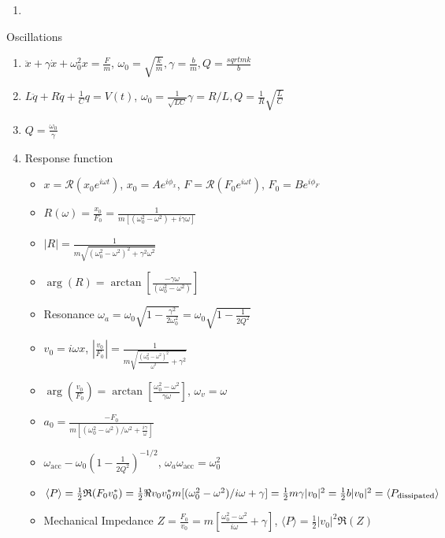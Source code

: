 \documentclass{article}
\theoremstyle{remark}
\theoremstyle{remark}
\newcommand{\realp}[1]{\mathfrak{R}(#1)}
\begin{document}
\begin{enumerate}
    \item 
\end{enumerate}

Oscillations
\begin{enumerate}
    \item $\ddot{x}+\gamma\dot{x}+\omega_0^2 x = \frac{F}{m} $, $\omega_0 = \sqrt{\frac{k}{m}}, \gamma=\frac{b}{m}, Q = \frac{sqrt{mk}}{b} $
    \item $L\ddot{q}+R\dot{q}+\frac{1}{C}q=V(t) $, $\omega_0=\frac{1}{\sqrt{LC}} \gamma = R/L, Q=\frac{1}{R}\sqrt{\frac{L}{C}} $
    \item $Q = \frac{\omega_0}{\gamma} $
    \item Response function\begin{itemize}
        \item $x=\mathcal{R}(x_0 e^{i\omega t}) $, $x_0 = Ae^{i\phi_x} $, $F = \mathcal{R}(F_0 e^{i\omega t}) $, $F_0 = Be^{i\phi_F} $
        \item $R(\omega) = \frac{x_0}{F_0} = \frac{1}{m[(\omega_0^2-\omega^2)+i\gamma\omega]} $
        \item $|R| = \frac{1}{m\sqrt{(\omega_0^2-\omega^2)^2+\gamma^2\omega^2}} $
        \item $\arg(R)=\arctan\left[\frac{-\gamma\omega}{(\omega_0^2-\omega^2)}\right] $
        \item Resonance $\omega_a = \omega_0\sqrt{1-\frac{\gamma^2}{2\omega_0^2}} = \omega_0\sqrt{1-\frac{1}{2Q^2}} $
        \item $v_0=i\omega x$, $\left|\frac{v_0}{F_0}\right| = \frac{1}{m\sqrt{\frac{(\omega_0^2-\omega^2)^2}{\omega^2}+\gamma^2}} $
        \item $\arg\left(\frac{v_0}{F_0}\right) = \arctan\left[\frac{\omega_0^2-\omega^2}{\gamma\omega}\right] $, $\omega_v=\omega $
        \item $a_0 = \frac{-F_0}{m[(\omega_0^2-\omega^2)/\omega^2+\frac{i\gamma}{\omega}]} $
        \item $\omega_{\text{acc}}-\omega_0\left(1-\frac{1}{2Q^2}\right)^{-1/2} $, $\omega_a\omega_{\text{acc}}=\omega_0^2 $
        \item $\langle P\rangle = \frac{1}{2}\realp{F_0v_0^*} = \frac{1}{2}\real{v_0v_0^*m[(\omega_0^2-\omega^2)/i\omega +\gamma]}=\frac{1}{2}m\gamma|v_0|^2=\frac{1}{2}b|v_0|^2 = \langle P_{\text{dissipated}}\rangle $
        \item Mechanical Impedance $Z=\frac{F_0}{v_0} = m\left[\frac{\omega_0^2-\omega^2}{i\omega}+\gamma\right] $, $\langle P\rangle = \frac{1}{2}|v_0|^2\realp{Z}$

\end{itemize}
\end{enumerate}
\end{document}
